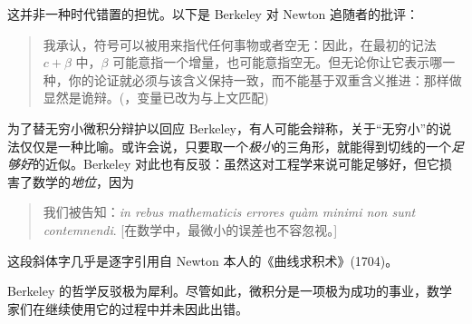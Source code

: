 \documentclass[../../../include/open-logic-section]{subfiles}
\begin{document}
这并非一种时代错置的担忧。以下是 Berkeley 对 Newton 追随者的批评：
\begin{quote}
我承认，符号可以被用来指代任何事物或者空无：因此，在最初的记法 $c + \beta$ 中，$\beta$ 可能意指一个增量，也可能意指空无。但无论你让它表示哪一种，你的论证就必须与该含义保持一致，而不能基于双重含义推进：那样做显然是诡辩。(\citealt[\S{}XIII]{Berkeley1734}，变量已改为与上文匹配)
\end{quote}
为了替无穷小微积分辩护以回应 Berkeley，有人可能会辩称，关于“无穷小”的说法仅仅是一种比喻。或许会说，只要取一个\emph{极小}的三角形，就能得到切线的一个\emph{足够好}的近似。Berkeley 对此也有反驳：虽然这对工程学来说可能足够好，但它损害了数学的\emph{地位}，因为
\begin{quote}
我们被告知：\emph{in rebus mathematicis errores qu\`{a}m minimi non sunt contemnendi}. [在数学中，最微小的误差也不容忽视。] \citep[\S{}IX]{Berkeley1734}
\end{quote}

这段斜体字几乎是逐字引用自 Newton 本人的《曲线求积术》(1704)。

Berkeley 的哲学反驳极为犀利。尽管如此，微积分是一项极为成功的事业，数学家们在继续使用它的过程中并未因此出错。
\end{document}

